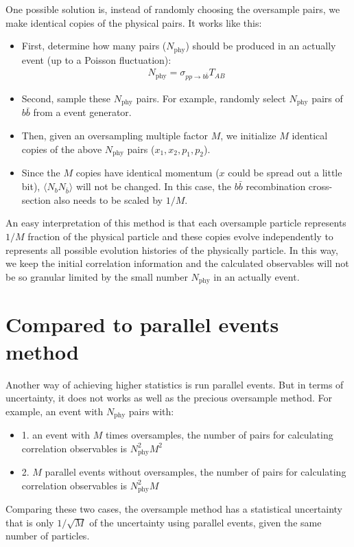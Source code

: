\documentclass[10pt,a4paper,draft]{article}
\begin{document}
One possible solution is, instead of randomly choosing the oversample pairs, we make identical copies of the physical pairs.
It works like this:
\begin{itemize}
\item First, determine how many pairs ($N_{\text{phy}}$) should be produced in an actually event (up to a Poisson fluctuation):
	\begin{eqnarray}
	N_{\text{phy}} = \sigma_{pp\rightarrow b\bar{b}}T_{AB} 
	\end{eqnarray}
\item Second, sample these $N_{\text{phy}}$ pairs. 
	For example, randomly select $N_{\text{phy}}$ pairs of $b\bar{b}$ from a event generator.
\item Then, given an oversampling multiple factor $M$, we initialize $M$ identical copies of the above $N_{\text{phy}}$ pairs ($x_1, x_2, p_1, p_2$).
\item Since the $M$ copies have identical momentum ($x$ could be spread out a little bit), $\langle N_b N_{\bar{b}}\rangle$ will not be changed.
In this case, the $b\bar{b}$ recombination cross-section also needs to be scaled by $1/M$.
\end{itemize}

An easy interpretation of this method is that each oversample particle represents $1/M$ fraction of the physical particle and these copies evolve independently to represents all possible evolution histories of the physically particle.
In this way, we keep the initial correlation information and the calculated observables will not be so granular limited by the small number $N_{\text{phy}}$ in an actually event.



\section{Compared to parallel events method}
Another way of achieving higher statistics is run parallel events.
But in terms of uncertainty, it does not works as well as the precious oversample method.
For example, an event with $N_{\text{phy}}$ pairs with: 
\begin{itemize}
\item 1. an event with $M$ times oversamples, the number of pairs for calculating correlation observables is $N_{\text{phy}}^2 M^2$
\item 2. $M$ parallel events without oversamples, the number of pairs for calculating correlation observables is $N_{\text{phy}}^2 M$
\end{itemize}
Comparing these two cases, the oversample method has a statistical uncertainty that is only $1/\sqrt{M}$ of the uncertainty using parallel events, given the same number of particles.
\end{document}
